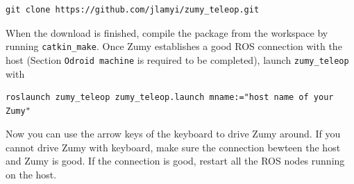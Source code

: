 \documentclass{article}
\begin{document}
\begin{Verbatim}[frame=single]
git clone https://github.com/jlamyi/zumy_teleop.git
\end{Verbatim}
When the download is finished, compile the package from the workspace by running \verb=catkin_make=. Once Zumy establishes a good ROS connection with the host (Section \verb=Odroid machine= is required to be completed), launch \verb=zumy_teleop= with

\begin{Verbatim}[frame=single]
roslaunch zumy_teleop zumy_teleop.launch mname:="host name of your Zumy"
\end{Verbatim}

Now you can use the arrow keys of the keyboard to drive Zumy around. If you cannot drive Zumy with keyboard, make sure the connection bewteen the host and Zumy is good. If the connection is good, restart all the ROS nodes running on the host.
\end{document}
